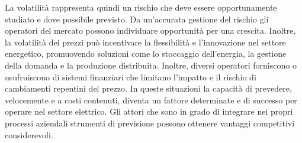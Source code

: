 \documentclass{article}
\begin{document}
La volatilità rappresenta quindi un rischio che deve essere opportunamente studiato e dove possibile previsto. Da un’accurata gestione del rischio gli operatori del mercato possono individuare opportunità per una crescita. Inoltre, la volatilità dei prezzi può incentivare la flessibilità e l'innovazione nel settore energetico, promuovendo soluzioni come lo stoccaggio dell'energia, la gestione della domanda e la produzione distribuita. Inoltre, diversi operatori forniscono o usufruiscono di sistemi finanziari che limitano l’impatto e il rischio di cambiamenti repentini del prezzo. In queste situazioni la capacità di prevedere, velocemente e a costi contenuti, diventa un fattore determinate e di successo per operare nel settore elettrico. Gli attori che sono in grado di integrare nei propri processi aziendali strumenti di previsione possono ottenere vantaggi competitivi considerevoli.\\

\end{document}
